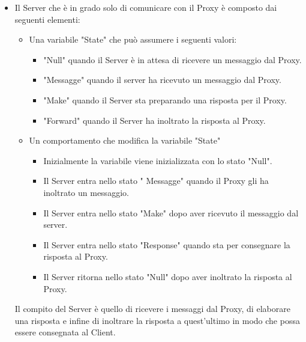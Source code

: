 \documentclass[13pt,a4paper]{article}
\begin{document}
\begin{itemize}
	\item Il Server che è in grado solo di comunicare con il Proxy è composto dai seguenti elementi:
	\begin{itemize}
		\item Una variabile "State" che può assumere i seguenti valori:
		\begin{itemize}
			\item "Null" quando il Server è in attesa di ricevere un messaggio dal Proxy.
			\item "Messagge" quando il server ha ricevuto un messaggio dal Proxy.
			\item "Make" quando il Server sta preparando una risposta per il Proxy.
			\item "Forward" quando il Server ha inoltrato la risposta al Proxy.
		\end{itemize}
		\item Un comportamento che modifica la variabile "State"
		\begin{itemize}
			\item Inizialmente la variabile viene inizializzata con lo stato "Null".
			\item Il Server entra nello stato " Messagge" quando il Proxy gli ha inoltrato un messaggio.
			\item Il Server entra nello stato "Make" dopo aver ricevuto il messaggio dal server.
			\item Il Server entra nello stato "Response" quando sta per consegnare la risposta al Proxy.
			\item Il Server ritorna nello stato "Null" dopo aver inoltrato la risposta al Proxy.
		\end{itemize}
	\end{itemize}
	Il compito del Server è quello di ricevere i messaggi dal Proxy, di elaborare una risposta e infine di inoltrare la risposta a quest'ultimo in modo che possa essere consegnata al Client.
\end{itemize}
\end{document}
